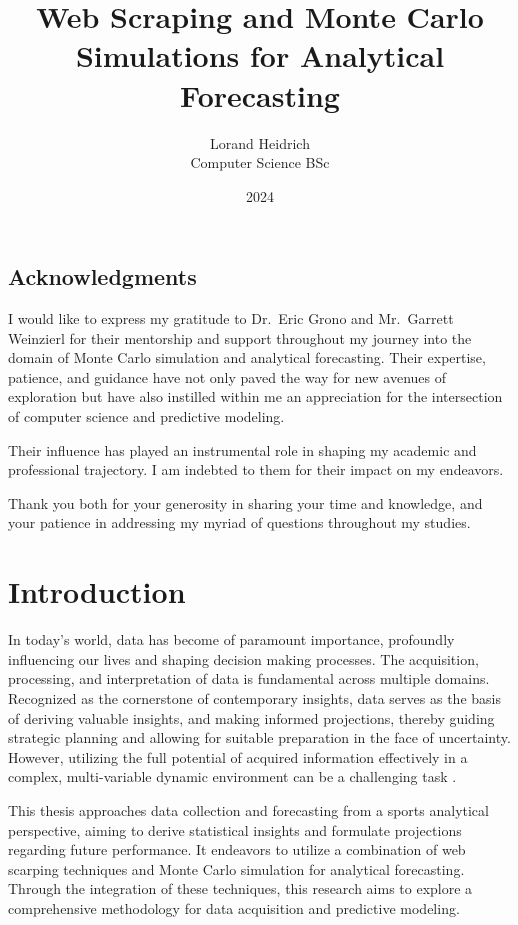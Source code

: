 \documentclass{thesis-ekf}
\institute{Institute of Mathematics and Informatics}
\title{Web Scraping and Monte Carlo Simulations for Analytical Forecasting}
\author{Lorand Heidrich\\ Computer Science BSc}
\date{2024}
\theoremstyle{definition}
\theoremstyle{remark}
\begin{document}
\maketitle


\clearpage
\section*{Acknowledgments}
\thispagestyle{empty} 
I would like to express my gratitude to Dr.~Eric Grono and Mr.~Garrett Weinzierl for their mentorship and support throughout my journey into the domain of Monte Carlo simulation and analytical forecasting. Their expertise, patience, and guidance have not only paved the way for new avenues of exploration but have also instilled within me an appreciation for the intersection of computer science and predictive modeling.

Their influence has played an instrumental role in shaping my academic and professional trajectory. I am indebted to them for their impact on my endeavors.

Thank you both for your generosity in sharing your time and knowledge, and your patience in addressing my myriad of questions throughout my studies. 


\tableofcontents


\chapter{Introduction}
In today’s world, data has become of paramount importance, profoundly influencing our lives and shaping decision making processes. The acquisition, processing, and interpretation of data is fundamental across multiple domains. \cite{Mondaut} Recognized as the cornerstone of contemporary insights, data serves as the basis of deriving valuable insights, and making informed projections, thereby guiding strategic planning and allowing for suitable preparation in the face of uncertainty. However, utilizing the full potential of acquired information effectively in a complex, multi-variable dynamic environment can be a challenging task \cite{Kornwitz}.

This thesis approaches data collection and forecasting from a sports analytical perspective, aiming to derive statistical insights and formulate projections regarding future performance. It endeavors to utilize a combination of web scarping techniques \cite{Khder} and Monte Carlo simulation \cite{Aderibigbe} for analytical forecasting. Through the integration of these techniques, this research aims to explore a comprehensive methodology for data acquisition and predictive modeling.
\end{document}
